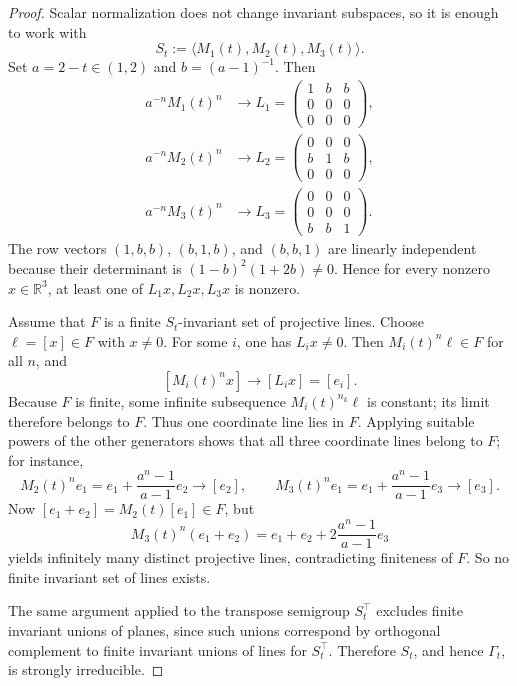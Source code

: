 \documentclass[11pt]{amsart}
\theoremstyle{definition}
\newcommand{\R}{\mathbb{R}}
\begin{document}
\begin{proof}
Scalar normalization does not change invariant subspaces, so it is enough to work with
\[
S_t:=\langle M_1(t),M_2(t),M_3(t)\rangle.
\]
Set $a=2-t\in(1,2)$ and $b=(a-1)^{-1}$. Then
\begin{align*}
a^{-n}M_1(t)^n &\longrightarrow
L_1=
\begin{pmatrix}
1&b&b\\
0&0&0\\
0&0&0
\end{pmatrix},\\
a^{-n}M_2(t)^n &\longrightarrow
L_2=
\begin{pmatrix}
0&0&0\\
b&1&b\\
0&0&0
\end{pmatrix},\\
a^{-n}M_3(t)^n &\longrightarrow
L_3=
\begin{pmatrix}
0&0&0\\
0&0&0\\
b&b&1
\end{pmatrix}.
\end{align*}
The row vectors $(1,b,b)$, $(b,1,b)$, and $(b,b,1)$ are linearly independent because their determinant is $(1-b)^2(1+2b)\neq0$. Hence for every nonzero $x\in\R^3$, at least one of $L_1x,L_2x,L_3x$ is nonzero.

Assume that $F$ is a finite $S_t$-invariant set of projective lines. Choose $\ell=[x]\in F$ with $x\neq0$. For some $i$, one has $L_ix\neq0$. Then $M_i(t)^n\ell\in F$ for all $n$, and
\[
[M_i(t)^n x]\longrightarrow [L_i x]=[e_i].
\]
Because $F$ is finite, some infinite subsequence $M_i(t)^{n_k}\ell$ is constant; its limit therefore belongs to $F$. Thus one coordinate line lies in $F$. Applying suitable powers of the other generators shows that all three coordinate lines belong to $F$; for instance,
\[
M_2(t)^n e_1 = e_1+\frac{a^n-1}{a-1}e_2 \longrightarrow [e_2],
\qquad
M_3(t)^n e_1 = e_1+\frac{a^n-1}{a-1}e_3 \longrightarrow [e_3].
\]
Now $[e_1+e_2]=M_2(t)[e_1]\in F$, but
\[
M_3(t)^n(e_1+e_2)=e_1+e_2+2\frac{a^n-1}{a-1}e_3
\]
yields infinitely many distinct projective lines, contradicting finiteness of $F$. So no finite invariant set of lines exists.

The same argument applied to the transpose semigroup $S_t^\top$ excludes finite invariant unions of planes, since such unions correspond by orthogonal complement to finite invariant unions of lines for $S_t^\top$. Therefore $S_t$, and hence $\Gamma_t$, is strongly irreducible.
\end{proof}
\end{document}
